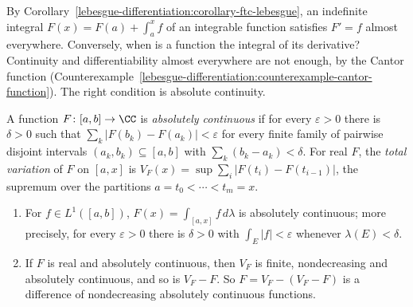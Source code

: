 By Corollary~\ref{lebesgue-differentiation:corollary-ftc-lebesgue}, an indefinite integral $F(x) = F(a) + \int_a^xf$ of an integrable function satisfies $F' = f$ almost everywhere.
Conversely, when is a function the integral of its derivative? Continuity and differentiability almost everywhere are not enough, by the Cantor function
(Counterexample~\ref{lebesgue-differentiation:counterexample-cantor-function}). The right condition is absolute continuity.

\begin{definition}\label{lebesgue-differentiation:definition-absolutely-continuous}
A function $F \colon [a, b] \to \CC$ is \emph{absolutely continuous} if for every $\varepsilon > 0$ there is $\delta > 0$ such that $\sum_k|F(b_k) - F(a_k)| < \varepsilon$ for every finite
family of pairwise disjoint intervals $(a_k, b_k) \subseteq [a, b]$ with $\sum_k(b_k - a_k) < \delta$. For real $F$, the \emph{total variation} of $F$ on $[a, x]$ is
$V_F(x) = \sup\sum_i|F(t_i) - F(t_{i-1})|$, the supremum over the partitions $a = t_0 < \cdots < t_m = x$.
\end{definition}

\begin{lemma}\label{lebesgue-differentiation:lemma-absolutely-continuous}
\begin{enumerate}
\item For $f \in L^1([a, b])$, $F(x) = \int_{[a,x]}f\,d\lambda$ is absolutely continuous; more precisely, for every $\varepsilon > 0$ there is $\delta > 0$ with $\int_E|f| < \varepsilon$
whenever $\lambda(E) < \delta$.
\item If $F$ is real and absolutely continuous, then $V_F$ is finite, nondecreasing and absolutely continuous, and so is $V_F - F$. So $F = V_F - (V_F - F)$ is a difference of
nondecreasing absolutely continuous functions.
\end{enumerate}
\end{lemma}

